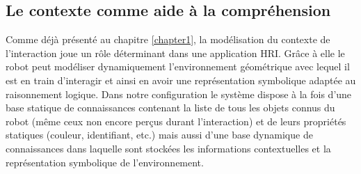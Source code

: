 \documentclass[a4paper,11pt,twoside]{StyleThese}
\begin{document}



\subsection{Le contexte comme aide à la compréhension}

Comme déjà présenté au chapitre \ref{chapter1}, la modélisation du contexte de l’interaction joue un rôle déterminant dans une application HRI. Grâce à elle le robot peut modéliser dynamiquement l’environnement
géométrique avec lequel il est en train d’interagir et ainsi en avoir une représentation symbolique adaptée au raisonnement logique.
Dans notre configuration le système dispose à la fois d’une base statique de connaissances contenant la liste de tous les objets connus du robot (même ceux non encore perçus durant l’interaction) et de leurs propriétés statiques (couleur, identifiant, etc.) mais aussi d’une base dynamique de connaissances dans laquelle sont stockées les informations contextuelles et la représentation symbolique de l'environnement.
\end{document}
